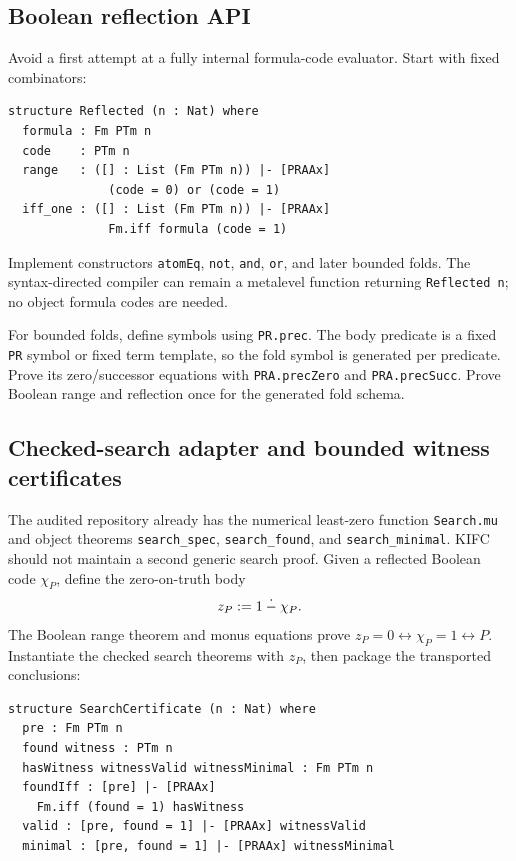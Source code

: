 \subsection{Boolean reflection API}

Avoid a first attempt at a fully internal formula-code evaluator.  Start with fixed combinators:

\begin{lstlisting}
structure Reflected (n : Nat) where
  formula : Fm PTm n
  code    : PTm n
  range   : ([] : List (Fm PTm n)) |- [PRAAx]
              (code = 0) or (code = 1)
  iff_one : ([] : List (Fm PTm n)) |- [PRAAx]
              Fm.iff formula (code = 1)
\end{lstlisting}
Implement constructors \texttt{atomEq}, \texttt{not}, \texttt{and}, \texttt{or}, and later bounded folds.  The syntax-directed compiler can remain a metalevel function returning \texttt{Reflected n}; no object formula codes are needed.

For bounded folds, define symbols using \texttt{PR.prec}.  The body predicate is a fixed \texttt{PR} symbol or fixed term template, so the fold symbol is generated per predicate.  Prove its zero/successor equations with \texttt{PRA.precZero} and \texttt{PRA.precSucc}.  Prove Boolean range and reflection once for the generated fold schema.

\subsection{Checked-search adapter and bounded witness certificates}

The audited repository already has the numerical least-zero function \texttt{Search.mu} and object theorems \texttt{search\_spec}, \texttt{search\_found}, and \texttt{search\_minimal}.  KIFC should not maintain a second generic search proof.  Given a reflected Boolean code \(\chi_P\), define the zero-on-truth body
\[
  z_P\mathrel{:=} 1\mathbin{\dot-}\chi_P.
\]
The Boolean range theorem and monus equations prove \(z_P=0\leftrightarrow\chi_P=1\leftrightarrow P\).  Instantiate the checked search theorems with \(z_P\), then package the transported conclusions:

\begin{lstlisting}
structure SearchCertificate (n : Nat) where
  pre : Fm PTm n
  found witness : PTm n
  hasWitness witnessValid witnessMinimal : Fm PTm n
  foundIff : [pre] |- [PRAAx]
    Fm.iff (found = 1) hasWitness
  valid : [pre, found = 1] |- [PRAAx] witnessValid
  minimal : [pre, found = 1] |- [PRAAx] witnessMinimal
\end{lstlisting}


